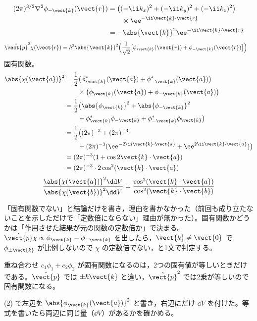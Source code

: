 \begin{align*}
(2\pi)^{3/2}\nabla^{2}\phi_{-\vect{k}}(\vect{r})&=\bigl((-\ii k_{x})^{2}+(-\ii k_{y})^{2}+(-\ii k_{z})^{2}\bigr)\\
&\qquad\times\ee^{-\ii\vect{k}\cdot\vect{r}}\\
&=-\abs{\vect{k}}^{2}\ee^{-\ii\vect{k}\cdot\vect{r}}
\end{align*}
\begin{align*}
\hat{\vect{p}}^{2}\chi(\vect{r})&=\hbar^{2}\abs{\vect{k}}^{2}\Bigl(\frac{1}{\sqrt{2}}\bigl[\phi_{\vect{k}}(\vect{r})+\phi_{-\vect{k}}(\vect{r})\bigr]\Bigr)
\end{align*}
固有関数。
\begin{align*}
\abs{\chi(\vect{a})}^{2}&=\frac{1}{2}\bigl(\phi_{\vect{k}}^{*}(\vect{a})+\phi_{-\vect{k}}^{*}(\vect{a})\bigr)\\
&\qquad\times\bigl(\phi_{\vect{k}}(\vect{a})+\phi_{-\vect{k}}(\vect{a})\bigr)\\
&=\frac{1}{2}\bigl(\abs{\phi_{\vect{k}}}^{2}+\abs{\phi_{-\vect{k}}}^{2}\\
&\qquad+\phi_{\vect{k}}^{*}\phi_{-\vect{k}}+\phi_{-\vect{k}}^{*}\phi_{\vect{k}}\bigr)\\
&=\frac{1}{2}\bigl((2\pi)^{-3}+(2\pi)^{-3}\\
&\qquad+(2\pi)^{-3}(\ee^{-2\ii\vect{k}\cdot\vect{a}}+\ee^{2\ii\vect{k}\cdot\vect{a}})\bigr)\\
&=(2\pi)^{-3}(1+\cos2\vect{k}\cdot\vect{a})\\
&=(2\pi)^{-3}\cdot2\cos^{2}(\vect{k}\cdot\vect{a})
\end{align*}
\[ \frac{\abs{\chi(\vect{a})}^{2}\dd V}{\abs{\chi(\vect{b})}^{2}\dd V}=\frac{\cos^{2}(\vect{k}\cdot\vect{a})}{\cos^{2}(\vect{k}\cdot\vect{b})} \]
\item {} 「固有関数でない」と結論だけを書き，理由を書かなかった（前回も成り立たないことを示しただけで「定数倍にならない」理由が無かった）。固有関数かどうかは「作用させた結果が元の関数の定数倍か」で決まる。$\hat{\vect{p}}\chi\propto\phi_{\vect{k}}-\phi_{-\vect{k}}$ を出したら，$\vect{k}\neq\vect{0}$ で $\phi_{\pm\vect{k}}$ が比例しないので $\chi$ の定数倍でない，と1文で判定する。
\item 重ね合わせ $c_{1}\phi_{1}+c_{2}\phi_{2}$ が固有関数になるのは，2つの固有値が等しいときだけである。$\hat{\vect{p}}$ では $\pm\hbar\vect{k}$ と違い，$\hat{\vect{p}}^{2}$ では2乗が等しいので固有関数になる。
\item (2) で左辺を $\abs{\phi_{\vect{k}}(\vect{a})}^{2}$ と書き，右辺にだけ $\dd V$ を付けた。等式を書いたら両辺に同じ量（$\dd V$）があるかを確かめる。
